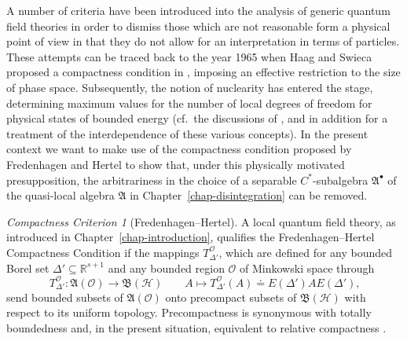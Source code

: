 \documentclass[11pt,twoside,openright]{report}
\theoremstyle{definition}
\theoremstyle{plain}
\theoremstyle{remark}
\theoremstyle{assumption}
\newtheorem*{Com}{Compactness Criterion}
\newcommand{\Afrak}{\mathfrak{A}}
\newcommand{\Oscr}{\mathscr{O}}
\newcommand{\Rsone}{\mathbb{R}^{s + 1}}
\newcommand{\BH}{\mathfrak{B} ( \mathscr{H} )}
\newcommand{\EDprime}{E ( \Delta' )}
\newcommand{\AO}{\mathfrak{A} ( \mathscr{O} )}
\newcommand{\Abullet}{\mathfrak{A}^\bullet}
\newcommand{\TODprime}{T_{\Delta'}^\Oscr}
\begin{document}
A number of criteria have been introduced into the analysis of generic
quantum field theories in order to dismiss those which are not
reasonable form a physical point of view in that they do not allow for
an interpretation in terms of particles. These attempts can be traced
back to the year 1965 when Haag and Swieca proposed a compactness
condition in \cite{haag/swieca:1965}, imposing an effective
restriction to the size of phase space. Subsequently, the notion of
nuclearity has entered the stage, determining maximum values for the
number of local degrees of freedom for physical states of bounded
energy (cf.~the discussions of
\cite{buchholz/wichmann:1986,buchholz/dantoni/longo:1990,haag:1984},
and in addition \cite{buchholz/porrmann:1990} for a treatment of the
interdependence of these various concepts). In the present context we
want to make use of the compactness condition proposed by Fredenhagen
and Hertel \cite{fredenhagen/hertel:1979} to show that, under this
physically motivated presupposition, the arbitrariness in the choice
of a separable $C^*$-subalgebra $\Abullet$ of the quasi-local algebra
$\Afrak$ in Chapter~\ref{chap-disintegration} can be removed.
\begin{Com}[Fredenhagen--Hertel]
  A local quantum field theory, as introduced in
  Chapter~\ref{chap-introduction}, qualifies the Fredenhagen--Hertel
  Compactness Condition if the mappings $\TODprime$, which are defined
  for any bounded Borel set $\Delta' \subseteq \Rsone$ and any bounded
  region $\Oscr$ of Minkowski space through
  \begin{equation*}
    \TODprime : \AO \rightarrow \BH \qquad A \mapsto \TODprime ( A )
    \doteq \EDprime A \EDprime \text{,}
  \end{equation*}
  send bounded subsets of $\AO$ onto precompact subsets of $\BH$ with
  respect to its uniform topology. Precompactness is synonymous with
  totally boundedness and, in the present situation, equivalent to
  relative compactness \cite[Chapter~One, \S\,4,\,5.]{koethe:1983}.
\end{Com}
\end{document}
